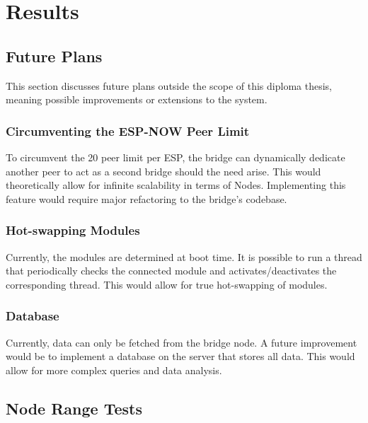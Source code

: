 \renewcommand*\chapterpagestyle{scrheadings}
\chapter{Results} 

\section{Future Plans}
This section discusses future plans outside the scope of this diploma thesis,
meaning possible improvements or extensions to the system.

    \subsection{Circumventing the ESP-NOW Peer Limit}
    To circumvent the 20 peer limit per ESP, the bridge can dynamically
    dedicate another peer to act as a second bridge should the
    need arise. This would theoretically allow for infinite scalability in terms
    of Nodes. Implementing this feature would require major refactoring to the
    bridge's codebase.

    \subsection{Hot-swapping Modules}
    Currently, the modules are determined at boot time. It is possible to run
    a thread that periodically checks the connected module and activates/deactivates 
    the corresponding thread. This would allow for true hot-swapping of modules.

    \subsection{Database}
    Currently, data can only be fetched from the bridge node.
    A future improvement would be to implement a database on the
    server that stores all data. This would allow for more 
    complex queries and data analysis.

\section{Node Range Tests}


